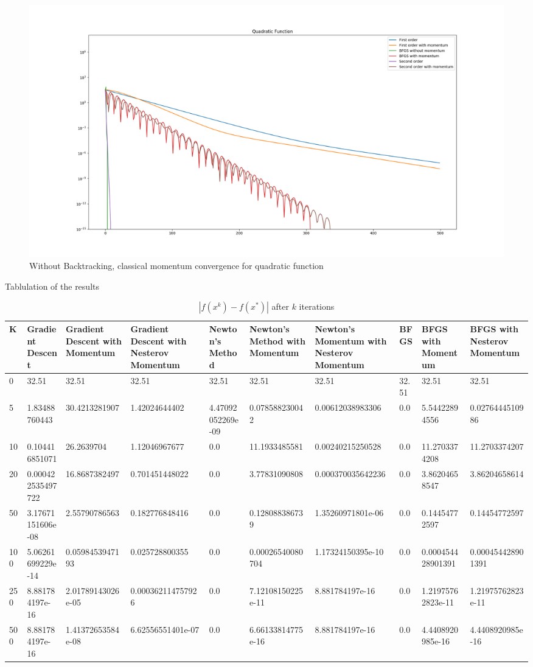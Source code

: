 \documentclass{article}
\begin{document}
\begin{figure}[H]
	\includegraphics[width=\linewidth]{../Images/quadraticmomentum1.png}
	\caption{Without Backtracking, classical momentum convergence for quadratic function}
	\label{fig:Without Backtracking, classical momentum convergence for quadratic function}
\end{figure}

Tablulation of the results

\begin{table}[H]
	\centering
	\caption{$ | f(x^k) - f(x^*) | $ after $k$ iterations}
	\label{Quadratic function table}
	\begin{tabular}{|l|l|l|l|l|l|l|l|l|l|}
		\hline
		K & Gradient Descent & Gradient Descent with Momentum & Gradient Descent with Nesterov Momentum & Newton's Method & Newton's Method with Momentum & Newton's Momentum with Nesterov Momentum & BFGS & BFGS with Momentum & BFGS with Nesterov Momentum \\
		\hline
		0 & 32.51 & 32.51 & 32.51 & 32.51 & 32.51 & 32.51 & 32.51 & 32.51 & 32.51 \\
		\hline
		5 & 1.83488760443 & 30.4213281907 & 1.42024644402 & 4.47092052269e-09 & 0.078588230042 & 0.00612038983306 & 0.0 & 5.54422894556 & 0.0276444510986 \\
		\hline
		10 & 0.104416851071 & 26.2639704 & 1.12046967677 & 0.0 & 11.1933485581 & 0.00240215250528 & 0.0 & 11.2703374208 & 11.2703374207 \\
		\hline
		20 & 0.000422535497722 & 16.8687382497 & 0.701451448022 & 0.0 & 3.77831090808 & 0.000370035642236 & 0.0 & 3.86204658547 & 3.86204658614 \\
		\hline
		50 & 3.17671151606e-08 & 2.55790786563 & 0.182776848416 & 0.0 & 0.128088386739 & 1.35260971801e-06 & 0.0 & 0.14454772597 & 0.14454772597 \\
		\hline
		100 & 5.06261699229e-14 & 0.0598453947193 & 0.025728800355 & 0.0 & 0.00026540080704 & 1.17324150395e-10 & 0.0 & 0.000454428901391 & 0.000454428901391 \\
		\hline
		250 & 8.881784197e-16 & 2.01789143026e-05 & 0.000362114757926 & 0.0 & 7.12108150225e-11 & 8.881784197e-16 & 0.0 & 1.21975762823e-11 & 1.21975762823e-11 \\
		\hline
		500 & 8.881784197e-16 & 1.41372653584e-08 & 6.62556551401e-07 & 0.0 & 6.66133814775e-16 & 8.881784197e-16 & 0.0 & 4.4408920985e-16 & 4.4408920985e-16 \\
		\hline
	\end{tabular}
\end{table}
\end{document}
